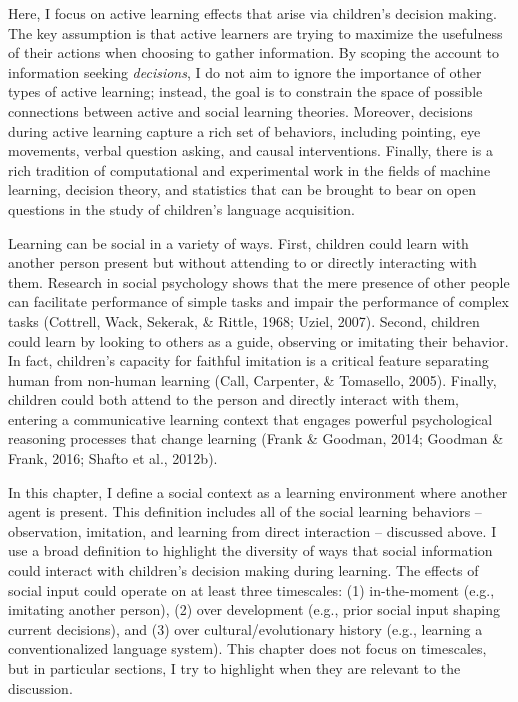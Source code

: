 \documentclass[oneside]{report}
\begin{document}
Here, I focus on active learning effects that arise via children's
decision making. The key assumption is that active learners are trying
to maximize the usefulness of their actions when choosing to gather
information. By scoping the account to information seeking
\emph{decisions}, I do not aim to ignore the importance of other types
of active learning; instead, the goal is to constrain the space of
possible connections between active and social learning theories.
Moreover, decisions during active learning capture a rich set of
behaviors, including pointing, eye movements, verbal question asking,
and causal interventions. Finally, there is a rich tradition of
computational and experimental work in the fields of machine learning,
decision theory, and statistics that can be brought to bear on open
questions in the study of children's language acquisition.

Learning can be social in a variety of ways. First, children could learn
with another person present but without attending to or directly
interacting with them. Research in social psychology shows that the mere
presence of other people can facilitate performance of simple tasks and
impair the performance of complex tasks (Cottrell, Wack, Sekerak, \&
Rittle, 1968; Uziel, 2007). Second, children could learn by looking to
others as a guide, observing or imitating their behavior. In fact,
children's capacity for faithful imitation is a critical feature
separating human from non-human learning (Call, Carpenter, \& Tomasello,
2005). Finally, children could both attend to the person and directly
interact with them, entering a communicative learning context that
engages powerful psychological reasoning processes that change learning
(Frank \& Goodman, 2014; Goodman \& Frank, 2016; Shafto et al., 2012b).

In this chapter, I define a social context as a learning environment
where another agent is present. This definition includes all of the
social learning behaviors -- observation, imitation, and learning from
direct interaction -- discussed above. I use a broad definition to
highlight the diversity of ways that social information could interact
with children's decision making during learning. The effects of social
input could operate on at least three timescales: (1) in-the-moment
(e.g., imitating another person), (2) over development (e.g., prior
social input shaping current decisions), and (3) over
cultural/evolutionary history (e.g., learning a conventionalized
language system). This chapter does not focus on timescales, but in
particular sections, I try to highlight when they are relevant to the
discussion.
\end{document}
